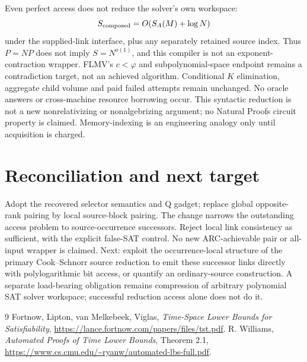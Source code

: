 \documentclass[11pt]{article}
\begin{document}
Even perfect access does not reduce the solver's own workspace:
\[
 S_{\rm composed}=O(S_A(M)+\log N)
\]
under the supplied-link interface, plus any separately retained source index.
Thus $P=NP$ does not imply $S=N^{o(1)}$, and this compiler is not an
exponent-contraction wrapper. FLMV's $c<\varphi$ and subpolynomial-space
endpoint remains a contradiction target, not an achieved algorithm.
Conditional $K$ elimination, aggregate child volume and paid failed attempts
remain unchanged. No oracle answers or cross-machine resource borrowing occur.
This syntactic reduction is not a new nonrelativizing or nonalgebrizing
argument; no Natural Proofs circuit property is claimed.
Memory-indexing is an engineering analogy only until acquisition is charged.

\section{Reconciliation and next target}
Adopt the recovered selector semantics and Q gadget; replace global
opposite-rank pairing by local source-block pairing. The change narrows
the outstanding access problem to source-occurrence successors.
Reject local link consistency as sufficient, with the explicit false-SAT control.
No new ARC-achievable pair or all-input wrapper is claimed.
Next: exploit the occurrence-local structure of the primary Cook--Schnorr
source reduction to emit these successor links directly with
polylogarithmic bit access, or quantify an ordinary-source construction.
A separate load-bearing obligation remains compression of arbitrary
polynomial SAT solver workspace; successful reduction access alone does not do it.

\begin{thebibliography}{9}
 Fortnow, Lipton, van Melkebeek, Viglas,
\emph{Time-Space Lower Bounds for Satisfiability},
\url{https://lance.fortnow.com/papers/files/tst.pdf}.
 R. Williams, \emph{Automated Proofs of Time Lower Bounds},
Theorem 2.1, \url{https://www.cs.cmu.edu/~ryanw/automated-lbs-full.pdf}.
\end{thebibliography}
\end{document}
